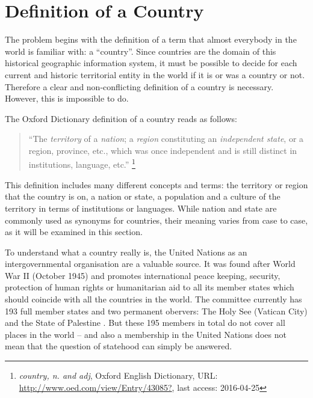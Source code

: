 \section{Definition of a Country} %
\label{sec:definition_of_a_country}

The problem begins with the definition of a term that almost everybody in the world is familiar with: a ``country''. Since countries are the domain of this historical geographic information system, it must be possible to decide for each current and historic territorial entity in the world if it is or was a country or not. Therefore a clear and non-conflicting definition of a country is necessary. However, this is impossible to do.

The Oxford Dictionary definition of a country reads as follows:
\begin{quote}
  ``The \emph{territory} of a \emph{nation}; a \emph{region} constituting an \emph{independent state}, or a region, province, etc., which was once independent and is still distinct in institutions, language, etc.''
  \footnote{\textit{country, n. and adj}, Oxford English Dictionary, URL: \url{http://www.oed.com/view/Entry/43085?}, last access: 2016-04-25}
\end{quote}

This definition includes many different concepts and terms: the territory or region that the country is on, a nation or state, a population and a culture of the territory in terms of institutions or languages. While nation and state are commonly used as synonyms for countries, their meaning varies from case to case, as it will be examined in this section.

To understand what a country really is, the United Nations as an intergovernmental organisation are a valuable source. It was found after World War II (October 1945) and promotes international peace keeping, security, protection of human rights or humanitarian aid to all its member states which should coincide with all the countries in the world. The committee currently has 193 full member states and two permanent obervers: The Holy See (Vatican City) and the State of Palestine \cite{UNmembers}. But these 195 members in total do not cover all places in the world -- and also a membership in the United Nations does not mean that the question of statehood can simply be answered.

